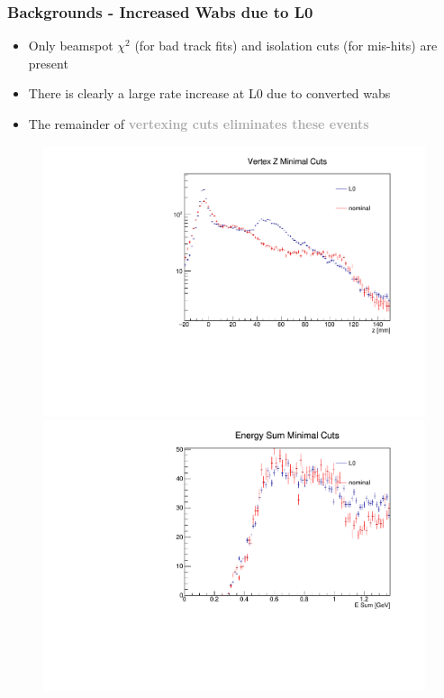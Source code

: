 \documentclass{beamer}
\begin{document}
\begin{frame}
\frametitle{Backgrounds - Increased Wabs due to L0}
\begin{itemize}
\item Only beamspot $\chi^2$ (for bad track fits) and isolation cuts (for mis-hits) are present
\item There is clearly a large rate increase at L0 due to converted wabs
\item The remainder of \textcolor{darkgray}{\textbf{vertexing cuts eliminates these events}}
\end{itemize}
\begin{figure}
\includegraphics[width=0.4\linewidth]{figs/log_uncVZ.pdf}
\includegraphics[width=0.4\linewidth]{figs/Esum.pdf}
\end{figure}

\end{frame}

\end{document}
